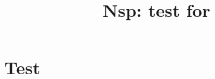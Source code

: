 \documentclass[11pt]{book}
\title{Nsp: test for \manname}
\begin{document}
\maketitle


\chapter{Test}

 \manname
\end{document}
